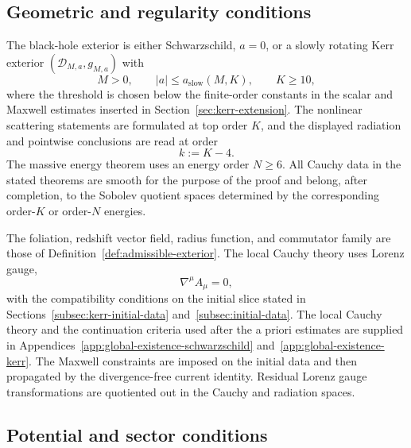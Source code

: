 \documentclass[11pt]{article}
\numberwithin{equation}{section}
\theoremstyle{plain}
\theoremstyle{definition}
\theoremstyle{remark}
\begin{document}
\subsection{Geometric and regularity conditions}\label{app:standing-geometry}

The black-hole exterior is either Schwarzschild, \(a=0\), or a slowly rotating Kerr exterior \((\mathcal D_{M,a},g_{M,a})\) with
\begin{equation}\label{eq:app-standing-slow}
 M>0,\qquad |a|\le a_{\mathrm{slow}}(M,K),\qquad K\ge10,
\end{equation}
where the threshold is chosen below the finite-order constants in the scalar and Maxwell estimates inserted in Section~\ref{sec:kerr-extension}.  The nonlinear scattering statements are formulated at top order \(K\), and the displayed radiation and pointwise conclusions are read at order
\begin{equation}\label{eq:app-standing-k}
 k:=K-4.
\end{equation}
The massive energy theorem uses an energy order \(N\ge6\).  All Cauchy data in the stated theorems are smooth for the purpose of the proof and belong, after completion, to the Sobolev quotient spaces determined by the corresponding order-\(K\) or order-\(N\) energies.

The foliation, redshift vector field, radius function, and commutator family are those of Definition~\ref{def:admissible-exterior}.  The local Cauchy theory uses Lorenz gauge,
\begin{equation}\label{eq:app-standing-lorenz}
 \nabla^\mu A_\mu=0,
\end{equation}
with the compatibility conditions on the initial slice stated in Sections~\ref{subsec:kerr-initial-data} and~\ref{subsec:initial-data}.  The local Cauchy theory and the continuation criteria used after the a priori estimates are supplied in Appendices~\ref{app:global-existence-schwarzschild} and~\ref{app:global-existence-kerr}.  The Maxwell constraints are imposed on the initial data and then propagated by the divergence-free current identity.  Residual Lorenz gauge transformations are quotiented out in the Cauchy and radiation spaces.

\subsection{Potential and sector conditions}\label{app:standing-potential-sector}
\end{document}
